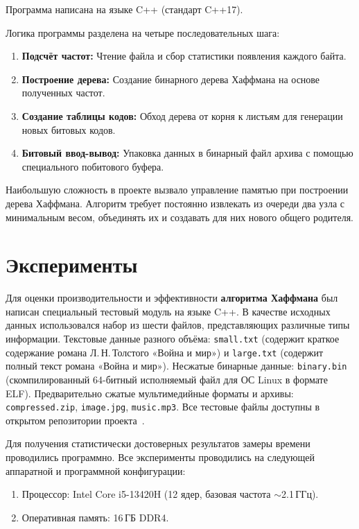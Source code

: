 \documentclass[a4paper]{article}
\begin{document}
Программа написана на языке C++ (стандарт C++17).

Логика программы разделена на четыре последовательных шага:

\begin{enumerate}
    \item \textbf{Подсчёт частот:} Чтение файла и сбор статистики появления каждого байта.
    \item \textbf{Построение дерева:} Создание бинарного дерева Хаффмана на основе полученных частот.
    \item \textbf{Создание таблицы кодов:} Обход дерева от корня к листьям для генерации новых битовых кодов.
    \item \textbf{Битовый ввод-вывод:} Упаковка данных в бинарный файл архива с помощью специального побитового буфера.
\end{enumerate}

Наибольшую сложность в проекте вызвало управление памятью при построении дерева Хаффмана.
Алгоритм требует постоянно извлекать из очереди два узла с минимальным весом, объединять их и
создавать для них нового общего родителя.

\section{Эксперименты}

Для оценки производительности и эффективности \textbf{алгоритма Хаффмана} был написан
специальный тестовый модуль на языке C++. В качестве исходных данных использовался набор из
шести файлов, представляющих различные типы информации. Текстовые данные разного объёма:
\texttt{small.txt} (содержит краткое содержание романа Л.\,Н.\,Толстого «Война и мир») и
\texttt{large.txt} (содержит полный текст романа «Война и мир»). Несжатые бинарные данные:
\texttt{binary.bin} (скомпилированный 64-битный исполняемый файл для ОС Linux в формате ELF).
Предварительно сжатые мультимедийные форматы и архивы: \texttt{compressed.zip}, \texttt{image.jpg},
\texttt{music.mp3}. Все тестовые файлы доступны в открытом репозитории проекта~\cite{repo}.

Для получения статистически достоверных результатов замеры времени проводились программно.
Все эксперименты проводились на следующей аппаратной и программной конфигурации:

\begin{enumerate}
    \item Процессор: Intel Core i5-13420H (12 ядер, базовая частота $\sim$2.1\,ГГц).
    \item Оперативная память: 16\,ГБ DDR4.
\end{enumerate}
\end{document}

